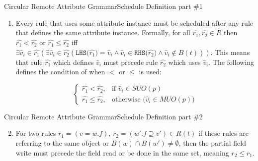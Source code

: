 \begin{frame}{Circular Remote Attribute Grammar}{Schedule Definition part \#1}
    
    \begin{definition}
\begin{enumerate}
\setcounter{enumi}{0}
  \item Every rule that uses some attribute instance must be scheduled after any rule that defines the same attribute instance. Formally, for all $\hat{r_1}, \hat{r_2} \in \hat R$ then $\hat{r_1} < \hat{r_2}$ or $\hat{r_1} \leq \hat{r_2}$ iff $\exists \hat{v}_i \in \hat{r_1} (\exists \hat{v}_i \in \hat{r_2} (\texttt{LHS($\hat{r_1}$)} = \hat{v}_i \wedge \hat{v}_i \in \texttt{RHS($\hat{r_2}$)}   \wedge \hat{v}_i \notin B(t) ))$. This means that rule $\hat{r_1}$ which defines $\hat{v}_i$ must precede rule $\hat{r_2}$ which uses $\hat{v}_i$. The following defines the condition of when $<$ or $\leq$ is used:

    \[ \begin{cases}
      \hat{r_1} < \hat{r_2},    & \text{if } \hat{v}_i \in \mathit{SUO}(p) \\
      \hat{r_1} \leq \hat{r_2}, & \text{otherwise (} \hat{v}_i \in \mathit{MUO}(p)  \text{)}     
    \end{cases} \]
\end{enumerate}
\end{definition}
    
\end{frame}

\begin{frame}{Circular Remote Attribute Grammar}{Schedule Definition part \#2}
\begin{definition}

\begin{enumerate}
\setcounter{enumi}{1}
  \item For two rules $r_1 = (v = w.f)$, $r_2 = (w'.f \supseteq v' ) \in R(t)$ if these rules are referring to the same object or $B(w) \cap B(w') \neq \emptyset$, then the partial field write must precede the field read or be done in the same set, meaning $r_2 \leq r_1$.
\end{enumerate}
\end{definition}
\end{frame}

